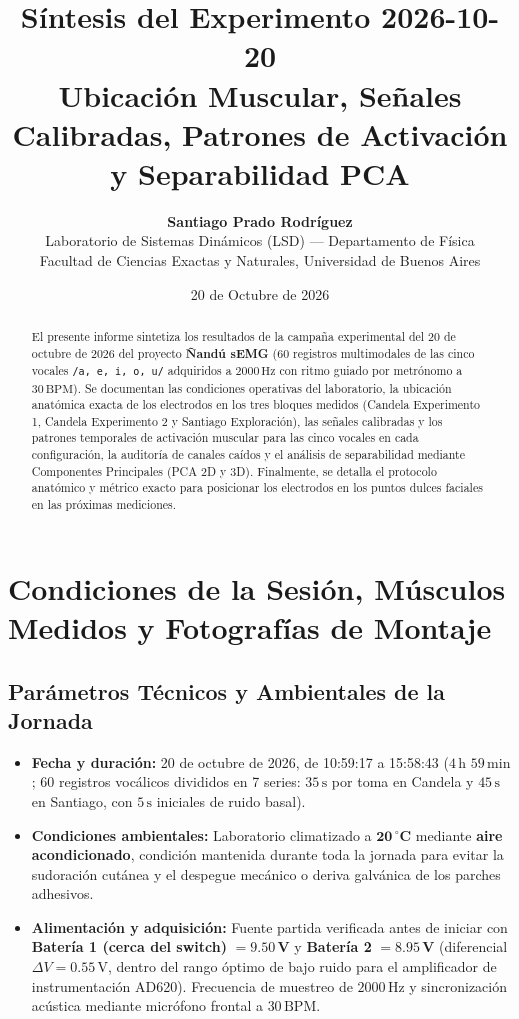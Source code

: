 \documentclass[11pt, a4paper]{article}
\title{
    \vspace{-1.4cm}
    \textbf{\Large Síntesis del Experimento 2026-10-20}\\[0.3em]
    \large Ubicación Muscular, Señales Calibradas, Patrones de Activación y Separabilidad PCA
}
\author{
    \textbf{Santiago Prado Rodríguez}\\[0.25em]
    \normalsize Laboratorio de Sistemas Dinámicos (LSD) --- Departamento de Física\\
    \normalsize Facultad de Ciencias Exactas y Naturales, Universidad de Buenos Aires
}
\date{20 de Octubre de 2026}
\begin{document}
\maketitle

\begin{abstract}
\noindent El presente informe sintetiza los resultados de la campaña experimental del 20 de octubre de 2026 del proyecto \textbf{Ñandú sEMG} (60 registros multimodales de las cinco vocales \texttt{/a, e, i, o, u/} adquiridos a $2000\,\text{Hz}$ con ritmo guiado por metrónomo a $30\,\text{BPM}$). Se documentan las condiciones operativas del laboratorio, la ubicación anatómica exacta de los electrodos en los tres bloques medidos (Candela Experimento 1, Candela Experimento 2 y Santiago Exploración), las señales calibradas y los patrones temporales de activación muscular para las cinco vocales en cada configuración, la auditoría de canales caídos y el análisis de separabilidad mediante Componentes Principales (PCA 2D y 3D). Finalmente, se detalla el protocolo anatómico y métrico exacto para posicionar los electrodos en los puntos dulces faciales en las próximas mediciones.
\end{abstract}

\section{Condiciones de la Sesión, Músculos Medidos y Fotografías de Montaje}

\subsection{Parámetros Técnicos y Ambientales de la Jornada}
\begin{itemize}\setlength{\itemsep}{1pt}
    \item \textbf{Fecha y duración:} 20 de octubre de 2026, de 10:59:17 a 15:58:43 ($4\,\text{h }59\,\text{min}$; 60 registros vocálicos divididos en 7 series: $35\,\text{s}$ por toma en Candela y $45\,\text{s}$ en Santiago, con $5\,\text{s}$ iniciales de ruido basal).
    \item \textbf{Condiciones ambientales:} Laboratorio climatizado a $\mathbf{20\,^\circ\text{C}}$ mediante \textbf{aire acondicionado}, condición mantenida durante toda la jornada para evitar la sudoración cutánea y el despegue mecánico o deriva galvánica de los parches adhesivos.
    \item \textbf{Alimentación y adquisición:} Fuente partida verificada antes de iniciar con \textbf{Batería 1 (cerca del switch)} $= \mathbf{9.50\,\text{V}}$ y \textbf{Batería 2} $= \mathbf{8.95\,\text{V}}$ (diferencial $\Delta V = 0.55\,\text{V}$, dentro del rango óptimo de bajo ruido para el amplificador de instrumentación AD620). Frecuencia de muestreo de $2000\,\text{Hz}$ y sincronización acústica mediante micrófono frontal a $30\,\text{BPM}$.
\end{itemize}
\end{document}
